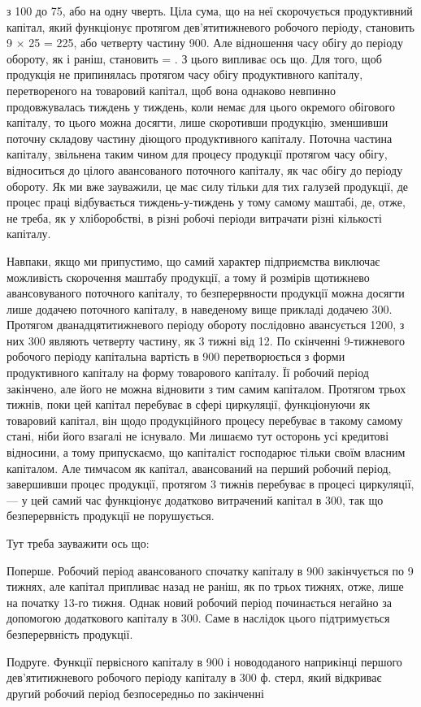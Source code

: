\parcont{}  %
з 100 до 75, або на одну чверть. Ціла сума, що на неї скорочується
продуктивний капітал, який функціонує протягом дев’ятитижневого робочого
періоду, становить 9 × 25 = 225, або четверту частину
900. Але відношення часу обігу до періоду обороту, як і раніш,
становить  = . З цього випливає ось що. Для того, щоб продукція
не припинялась протягом часу обігу продуктивного капіталу, перетвореного
на товаровий капітал, щоб вона однаково невпинно продовжувалась тиждень
у тиждень, коли немає для цього окремого обігового капіталу, то
цього можна досягти, лише скоротивши продукцію, зменшивши поточну
складову частину діющого продуктивного капіталу. Поточна частина капіталу,
звільнена таким чином для процесу продукції протягом часу обігу,
відноситься до цілого авансованого поточного капіталу, як час обігу до
періоду обороту. Як ми вже зауважили, це має силу тільки для тих галузей
продукції, де процес праці відбувається тиждень-у-тиждень у
тому самому маштабі, де, отже, не треба, як у хліборобстві, в різні робочі
періоди витрачати різні кількості капіталу.

Навпаки, якщо ми припустимо, що самий характер підприємства виключає
можливість скорочення маштабу продукції, а тому й розмірів щотижнево
авансовуваного поточного капіталу, то безперервности продукції
можна досягти лише додачею поточного капіталу, в наведеному вище
прикладі додачею 300. Протягом дванадцятитижневого періоду
обороту послідовно авансується 1200, з них 300 являють четверту
частину, як 3 тижні від 12. По скінченні 9-тижневого робочого
періоду капітальна вартість в 900 перетворюється з форми
продуктивного капіталу на форму товарового капіталу. Її робочий період
закінчено, але його не можна відновити з тим самим капіталом. Протягом
трьох тижнів, поки цей капітал перебуває в сфері циркуляції, функціонуючи
як товаровий капітал, він щодо продукційного процесу перебуває
в такому самому стані, ніби його взагалі не існувало. Ми лишаємо тут
осторонь усі кредитові відносини, а тому припускаємо, що капіталіст
господарює тільки своїм власним капіталом. Але тимчасом як капітал,
авансований на перший робочий період, завершивши процес продукції,
протягом 3 тижнів перебуває в процесі циркуляції, — у цей самий час
функціонує додатково витрачений капітал в 300, так що безперервність
продукції не порушується.

Тут треба зауважити ось що:

Поперше. Робочий період авансованого спочатку капіталу в 900 закінчується по 9 тижнях, але капітал припливає назад не раніш,
як по трьох тижнях, отже, лише на початку 13-го тижня. Однак новий
робочий період починається негайно за допомогою додаткового капіталу
в 300. Саме в наслідок цього підтримується безперервність
продукції.

Подруге. Функції первісного капіталу в 900 і новододаного
наприкінці першого дев’ятитижневого робочого періоду капіталу в 300 ф.
стерл, який відкриває другий робочий період безпосередньо по закінченні
\parbreak{}  %
